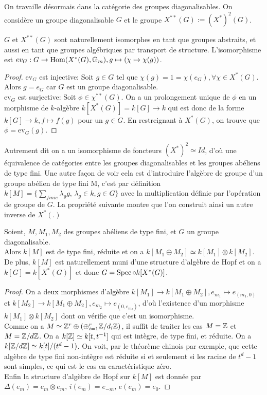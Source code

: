 On travaille désormais dans la catégorie des groupes diagonalisables. On considère un groupe diagonalisable $G$ et le groupe $X^{**}(G):=(X^*)^2(G)$.

\begin{prop}
$G$ et $X^{**}(G)$ sont naturellement isomorphes en tant que groupes abstraits, et aussi en tant que groupes algébriques par transport de structure. L'isomorphisme est $ev_G : G\rightarrow \operatorname{Hom} (X^*(G),\mathbb{G} _m), g\mapsto (\chi\mapsto \chi(g))$.
\end{prop}
\begin{proof}
ev$_G$ est injective: Soit $g\in G$ tel que $\chi(g)=1=\chi(e_G),\forall \chi\in X^*(G)$. Alors $g=e_G$ car $G$ est un groupe diagonalisable.\\
ev$_G$ est surjective: Soit $\phi\in\chi^{**}(G)$. On a un prolongement unique de $\phi$ en un morphisme de $k$-algèbre $k[X^*(G)]=k[G]\rightarrow k$ qui est donc de la forme $k[G]\rightarrow k, f\mapsto f(g)$ pour un $g\in G$. En restreignant à $X^*(G)$, on trouve que $\phi=\textrm{ev}_G(g)$.
\end{proof}

Autrement dit on a un isomorphisme de foncteurs $(X^*)^2\simeq Id$, d'où une équivalence de catégories entre les groupes diagonalisables et les groupes abéliens de type fini. Une autre façon de voir cela est d'introduire l'algèbre de groupe d'un groupe abélien de type fini M, c'est par définition $k[M]=\lbrace \sum_{finie} \lambda_gg,\,\lambda_g\in k,g\in G \rbrace$ avec la multiplication définie par l'opération de groupe de $G$. La propriété suivante montre que l'on construit ainsi un autre inverse de $X^*(.)$
\begin{prop}
Soient, $M, M_1, M_2$ des groupes abéliens de type fini, et $G$ un groupe diagonalisable.\\
Alors $k[M]$ est de type fini, réduite et on a $k[M_1\oplus M_2]\simeq k[M_1]\otimes k[M_2]$. De plus, $k[M]$ est naturellement muni d'une structure d'algèbre de Hopf et on a $k[G]=k[X^*(G)]$ et donc $G=\operatorname{Spec}\circ k[X^*(G)]$.
\end{prop}
\begin{proof}
On a deux morphismes d'algèbre $k[M_1]\rightarrow k[M_1\oplus M_2], e_{m_1}\mapsto e_{(m_1,0)}$ et $k[M_2]\rightarrow k[M_1\oplus M_2], e_{m_2}\mapsto e_{(0,e_{m_2})}$, d'où l'existence d'un morphisme $k[M_1]\otimes k[M_2]$ dont on vérifie que c'est un isomorphisme.\\
Comme on a $M\simeq \mathbb{Z}^r\oplus (\oplus_{i=1}^r \mathbb{Z}/d_i\mathbb{Z})$, il suffit de traiter les cas $M=\mathbb{Z}$ et $M=\mathbb{Z}/d\mathbb{Z}$. On a $k[\mathbb{Z}]\simeq k[t,t^{-1}]$ qui est intègre, de type fini, et réduite. On a $k[\mathbb{Z}/d\mathbb{Z}]\simeq k[t]/(t^d-1)$. On voit, par le théorème chinois par exemple, que cette algèbre de type fini non-intègre est réduite si et seulement si les racine de $t^d-1$ sont simples, ce qui est le cas en caractéristique zéro.\\
Enfin la structure d'algèbre de Hopf sur $k[M]$ est donnée par $\Delta(e_m)=e_m\otimes e_m,\, i(e_m)=e_{-m},\, e(e_m)=e_0$.
\end{proof}

